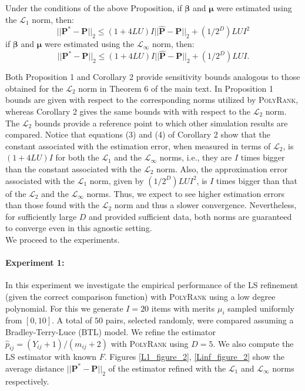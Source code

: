 \documentclass[twoside,11pt]{article}
\begin{document}
\begin{corollary}
Under the conditions of the above Proposition,  if $\boldsymbol{\beta}$ and $\boldsymbol{\mu}$ were estimated using the $\mathcal{L}_1$ norm, then:
\begin{equation}
||\boldsymbol{P^*} - \boldsymbol{P}||_2\leq (1+4LU)I||\boldsymbol{\hat{P}} - \boldsymbol{P}||_2  + (1/2^D)LUI^2
\end{equation}
 if $\boldsymbol{\beta}$ and $\boldsymbol{\mu}$ were estimated using the $\mathcal{L}_{\infty}$ norm, then:
\begin{equation}
||\boldsymbol{P^*} - \boldsymbol{P}||_2\leq (1+4LU)I||\boldsymbol{\hat{P}} - \boldsymbol{P}||_2  + (1/2^D)LUI.
\end{equation}
\end{corollary}

Both Proposition 1 and Corollary 2 provide sensitivity bounds analogous to those obtained for the $\mathcal{L}_2$ norm in Theorem 6 of the main text. In Proposition 1 bounds are given with respect to the corresponding norms utilized by \textsc{PolyRank}, whereas Corollary 2 gives the same bounds with with respect to the $\mathcal{L}_2$ norm. The $\mathcal{L}_2$ bounds provide a reference point to which other simulation results are compared. Notice that equations (3) and (4) of Corollary 2 show that the constant associated with the estimation error, when measured in terms of $\mathcal{L}_2$, is  $(1+4LU)I$ for both the $\mathcal{L}_1$ and the $\mathcal{L}_{\infty}$ norms, i.e., they are $I$ times bigger than the constant associated with the $\mathcal{L}_2$ norm. Also, the approximation error associated with the $\mathcal{L}_1$ norm, given by $(1/2^D)LUI^2$, is $I$ times bigger than that of the $\mathcal{L}_2$ and the $\mathcal{L}_{\infty}$ norms. Thus, we expect to see higher estimation errors than those found with the $\mathcal{L}_2$  norm and thus a slower convergence. Nevertheless, for sufficiently large $D$ and provided sufficient data, both norms are guaranteed to converge even in this agnostic setting.
\\

We proceed to the experiments.

\paragraph{Experiment 1:}  In this experiment we investigate the empirical performance of the LS refinement (given the correct comparison function) with \textsc{PolyRank} using a low degree polynomial. For this we  generate  $I = 20$ items with merits $\mu_i$ sampled uniformly from $ [0, 10]$. A total of $50$ pairs, selected randomly, were compared assuming a Bradley-Terry-Luce (BTL) model. We refine the estimator $\hat{p}_{ij} = (Y_{ij}+1)/(m_{ij}+2)$ with \textsc{PolyRank} using $D=5$. We also compute the LS estimator with known $F$.  Figures \ref{L1_figure_2},
\ref{Linf_figure_2}  show the  average distance $||\boldsymbol{P}^* - \boldsymbol{P}||_2$ of the estimator refined with the $\mathcal{L}_1$ and $\mathcal{L}_{\infty}$ norms respectively.
\end{document}
